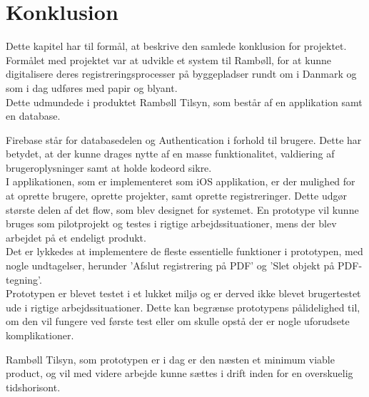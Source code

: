 \chapter{Konklusion}
Dette kapitel har til formål, at beskrive den samlede 
konklusion for projektet. \\

Formålet med projektet var at udvikle et system til Rambøll, for at kunne digitalisere deres registreringsprocesser på byggepladser rundt om i Danmark og som i dag udføres med papir og blyant. \\
Dette udmundede i produktet Rambøll Tilsyn, som består af en applikation samt en database.

Firebase står for databasedelen og Authentication i forhold til brugere. Dette har betydet, at der kunne drages nytte af en masse funktionalitet, valdiering af brugeroplysninger samt at holde kodeord sikre. \\
I applikationen, som er implementeret som iOS applikation, er der mulighed for at oprette brugere, oprette projekter, samt oprette registreringer. Dette udgør største delen af det flow, som blev designet for systemet. En prototype vil kunne bruges som pilotprojekt og testes i rigtige arbejdssituationer, mens der blev arbejdet på et endeligt produkt. \\
Det er lykkedes at implementere de fleste essentielle funktioner i prototypen, med nogle undtagelser, herunder 'Afslut registrering på PDF' og 'Slet objekt på PDF-tegning'. \\
Prototypen er blevet testet i et lukket miljø og er derved ikke blevet brugertestet ude i rigtige arbejdssituationer. Dette kan begrænse prototypens pålidelighed til, om den vil fungere ved første test eller om skulle opstå der er nogle uforudsete komplikationer.

Rambøll Tilsyn, som prototypen er i dag er den næsten et minimum viable product, og vil med videre arbejde
kunne sættes i drift inden for en overskuelig tidshorisont.


